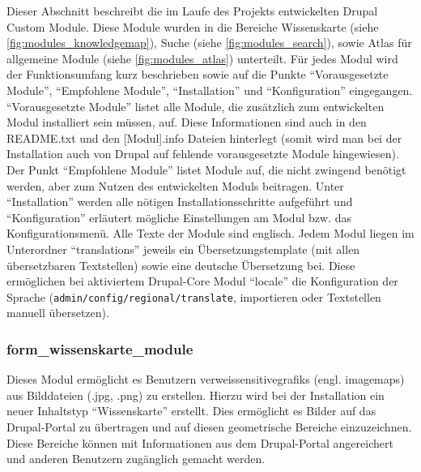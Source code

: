 Dieser Abschnitt beschreibt die im Laufe des Projekts entwickelten Drupal Custom Module. Diese Module wurden in die Bereiche Wissenskarte (siehe \cref{fig:modules_knowledgemap}), Suche (siehe \cref{fig:modules_search}), sowie Atlas für allgemeine Module (siehe \cref{fig:modules_atlas}) unterteilt.
Für jedes Modul wird der Funktionsumfang kurz beschrieben sowie auf die Punkte \enquote{Vorausgesetzte Module}, \enquote{Empfohlene Module}, \enquote{Installation} und \enquote{Konfiguration} eingegangen. \enquote{Vorausgesetzte Module} listet alle Module, die zusätzlich zum entwickelten Modul installiert sein müssen, auf. Diese Informationen sind auch in den README.txt und den [Modul].info Dateien hinterlegt (somit wird man bei der Installation auch von Drupal auf fehlende vorausgesetzte Module hingewiesen). Der Punkt \enquote{Empfohlene Module} listet Module auf, die nicht zwingend benötigt werden, aber zum Nutzen des entwickelten Moduls beitragen. Unter \enquote{Installation} werden alle nötigen Installationsschritte aufgeführt und \enquote{Konfiguration} erläutert mögliche Einstellungen am Modul bzw. das Konfigurationsmenü. Alle Texte der Module sind englisch. Jedem Modul liegen im Unterordner \enquote{translations} jeweils ein Übersetzungstemplate (mit allen übersetzbaren Textstellen) sowie eine deutsche Übersetzung bei. Diese ermöglichen bei aktiviertem Drupal-Core Modul \enquote{locale} die Konfiguration der Sprache (\lstinline|admin/config/regional/translate|, importieren oder Textstellen manuell übersetzen).






\newpage
\subsubsection{form\_wissenskarte\_module}\label{subsub:form_wissenskarte_module}
Dieses Modul ermöglicht es Benutzern \glspl{verweissensitivegrafik} (engl. \glspl{imagemap}) aus Bilddateien (.jpg, .png) zu erstellen. Hierzu wird bei der Installation ein neuer Inhaltstyp \enquote{Wissenskarte} erstellt. Dies ermöglicht es Bilder auf das Drupal-Portal zu übertragen und auf diesen geometrische Bereiche einzuzeichnen. Diese Bereiche können mit Informationen aus dem Drupal-Portal angereichert und anderen Benutzern zugänglich gemacht werden.

